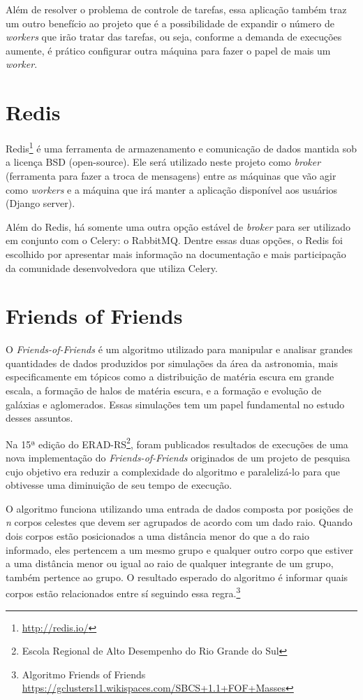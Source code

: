 \documentclass[tg]{mdtufsm}
\begin{document}
Além de resolver o problema de controle de tarefas, essa aplicação também traz um outro benefício ao projeto que é a possibilidade de expandir o número de \emph{workers} que irão tratar das tarefas, ou seja, conforme a demanda de execuções aumente, é prático configurar outra máquina para fazer o papel de mais um \emph{worker}.

\section{Redis}
Redis\footnote{\url{http://redis.io/}} é uma ferramenta de armazenamento e comunicação de dados mantida sob a licença BSD (open-source). Ele será utilizado neste projeto como \emph{broker} (ferramenta para fazer a troca de mensagens) entre as máquinas que vão agir como \emph{workers} e a máquina que irá manter a aplicação disponível aos usuários (Django server). 

Além do Redis, há somente uma outra opção estável de \emph{broker} para ser utilizado em conjunto com o Celery: o RabbitMQ. Dentre essas duas opções, o Redis foi escolhido por apresentar mais informação na documentação e mais participação da comunidade desenvolvedora que utiliza Celery.

\section{Friends of Friends}
O \emph{Friends-of-Friends} é um algoritmo utilizado para manipular e analisar grandes quantidades de dados produzidos por simulações da área da astronomia, mais especificamente em tópicos como a distribuição de matéria escura em grande escala, a formação de halos de matéria escura, e a formação e evolução de galáxias e aglomerados. Essas simulações tem um papel fundamental no estudo desses assuntos.\cite{Bertschinger,Efstathiou}

Na 15ª edição do ERAD-RS\footnote{Escola Regional de Alto Desempenho do Rio Grande do Sul}, foram publicados resultados de execuções de uma nova implementação do \emph{Friends-of-Friends}\cite{friends} originados de um projeto de pesquisa cujo objetivo era reduzir a complexidade do algoritmo e paralelizá-lo para que obtivesse uma diminuição de seu tempo de execução.

O algoritmo funciona utilizando uma entrada de dados composta por posições de \emph{n} corpos celestes que devem ser agrupados de acordo com um dado raio. Quando dois corpos estão posicionados a uma distância menor do que a do raio informado, eles pertencem a um mesmo grupo e qualquer outro corpo que estiver a uma distância menor ou igual ao raio de qualquer integrante de um grupo, também pertence ao grupo. O resultado esperado do algoritmo é informar quais corpos estão relacionados entre sí seguindo essa regra.\footnote{Algoritmo Friends of Friends \url{https://gclusters11.wikispaces.com/SBCS+1.1+FOF+Masses}}
\end{document}
